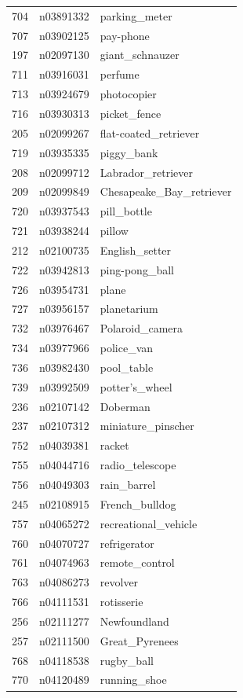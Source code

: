 \begin{table}
\begin{tabular}{cll}
704 & n03891332 & parking_meter \\
707 & n03902125 & pay-phone \\
197 & n02097130 & giant_schnauzer \\
711 & n03916031 & perfume \\
713 & n03924679 & photocopier \\
716 & n03930313 & picket_fence \\
205 & n02099267 & flat-coated_retriever \\
719 & n03935335 & piggy_bank \\
208 & n02099712 & Labrador_retriever \\
209 & n02099849 & Chesapeake_Bay_retriever \\
720 & n03937543 & pill_bottle \\
721 & n03938244 & pillow \\
212 & n02100735 & English_setter \\
722 & n03942813 & ping-pong_ball \\
726 & n03954731 & plane \\
727 & n03956157 & planetarium \\
732 & n03976467 & Polaroid_camera \\
734 & n03977966 & police_van \\
736 & n03982430 & pool_table \\
739 & n03992509 & potter's_wheel \\
236 & n02107142 & Doberman \\
237 & n02107312 & miniature_pinscher \\
752 & n04039381 & racket \\
755 & n04044716 & radio_telescope \\
756 & n04049303 & rain_barrel \\
245 & n02108915 & French_bulldog \\
757 & n04065272 & recreational_vehicle \\
760 & n04070727 & refrigerator \\
761 & n04074963 & remote_control \\
763 & n04086273 & revolver \\
766 & n04111531 & rotisserie \\
256 & n02111277 & Newfoundland \\
257 & n02111500 & Great_Pyrenees \\
768 & n04118538 & rugby_ball \\
770 & n04120489 & running_shoe \\

\end{tabular}
\end{table}
